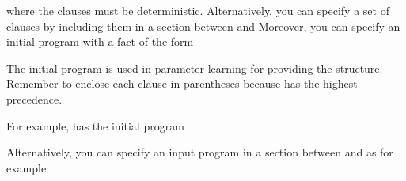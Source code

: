 \documentclass[letterpaper,10pt,english]{sphinxmanual}
\begin{document}
\begin{sphinxVerbatim}[commandchars=\\\{\}]
    
\end{sphinxVerbatim}

\sphinxAtStartPar
where the clauses must be deterministic.
Alternatively, you can specify a set of clauses by including them in a section between  and 
Moreover, you can specify an initial program with a fact of the form

\begin{sphinxVerbatim}[commandchars=\\\{\}]
    
\end{sphinxVerbatim}

\sphinxAtStartPar
The initial program is used in parameter learning for providing the structure.
Remember to enclose each clause in parentheses because \sphinxcode{\sphinxupquote{:\sphinxhyphen{}}} has the highest precedence.

\sphinxAtStartPar
For example,  has the initial program

\begin{sphinxVerbatim}[commandchars=\\\{\}]
\PYG{p}{[} 
 
 
   \PYG{p}{]}
\end{sphinxVerbatim}

\sphinxAtStartPar
Alternatively, you can specify an input program in a section between  and  as for example
\end{document}
